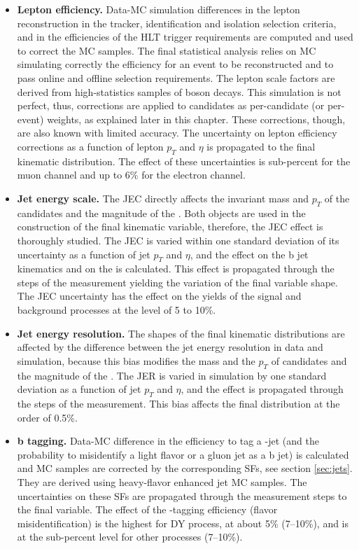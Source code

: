 \begin{itemize}

\item{\bf Lepton efficiency.} 
Data-MC simulation differences in the lepton reconstruction in the tracker, identification and isolation selection criteria, and in the efficiencies of the HLT trigger requirements are computed and used to correct the MC samples. The final statistical analysis relies on MC simulating correctly the efficiency for an event to be reconstructed and to pass online and offline selection requirements. The lepton scale factors are derived from high-statistics samples of \PZ boson decays. This simulation is not perfect, thus, corrections are applied to candidates as per-candidate (or per-event) weights, as explained later in this chapter. These corrections, though, are also known with limited accuracy. The uncertainty on lepton efficiency corrections as a function of lepton $p_T$ and $\eta$ is propagated to the final kinematic distribution. The effect of these uncertainties is sub-percent for the muon channel and up to 6\% for the electron channel.

\item{\bf Jet energy scale.}
The JEC directly affects the invariant mass and $p_T$ of the \HBB candidates and the magnitude of the \PTslash. Both objects are used in the construction of the final kinematic variable, therefore, the JEC effect is thoroughly studied. The JEC is varied within one standard deviation of its uncertainty as a function of jet $p_T$ and $\eta$, and the effect on the b jet kinematics and on the \PTslash is calculated. This effect is propagated through the steps of the measurement yielding the variation of the final variable shape. The JEC uncertainty has the effect on the yields of the signal and background processes at the level of 5 to 10\%.

\item{\bf Jet energy resolution.} 
The shapes of the final kinematic distributions are affected by the difference between the jet energy
  resolution in data and simulation, because this bias modifies the mass and the $p_T$ of \HBB candidates and the magnitude of the \PTslash. The JER is varied in simulation by one standard deviation as a function of
  jet $p_T$ and $\eta$, and the effect is propagated through the steps
  of the measurement. This bias affects the final distribution at the order of 0.5\%.

\item{\bf b tagging.}
Data-MC difference in the efficiency to tag a \PQb-jet (and the probability to misidentify a light flavor or a gluon jet as a b jet) is calculated and MC samples are corrected by the corresponding SFs, see section \ref{sec:jets}. They are derived using heavy-flavor enhanced jet MC samples. The uncertainties on these SFs are propagated through the measurement steps to the final variable. The effect of the \PQb-tagging efficiency (flavor misidentification) is the highest for DY process, at about 5\% (7--10\%), and is at the sub-percent level for other processes (7--10\%). 


\end{itemize}
